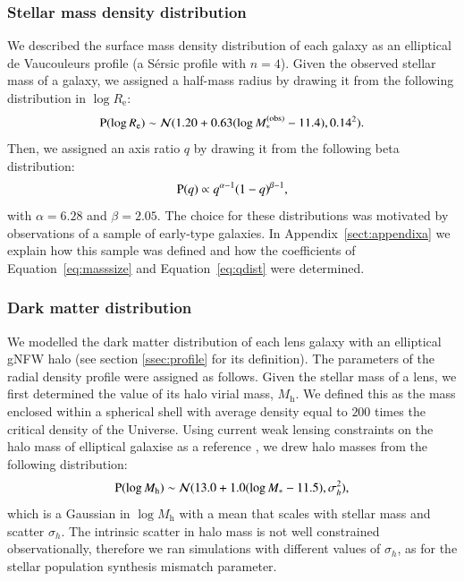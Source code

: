 \documentclass{aa}
\def\reff{R_{\mathrm{e}}}
\def\mstar{M_*}
\def\mobs{M_*^{(\mathrm{obs})}}
\def\mhalo{M_{\mathrm{h}}}
\def\Eref#1{Equation~\ref{#1}\xspace}
\def\pr{{\rm P}}
\begin{document}
\subsubsection{Stellar mass density distribution}

We described the surface mass density distribution of each galaxy as an elliptical de Vaucouleurs profile (a S\'{e}rsic profile with $n=4$).
Given the observed stellar mass of a galaxy, we assigned a half-mass radius by drawing it from the following distribution in $\log{\reff}$:
\begin{equation}\label{eq:masssize}
\pr(\log{\reff}) \sim \mathcal{N}(1.20 + 0.63(\log{\mobs} - 11.4), 0.14^2).
\end{equation}
Then, we assigned an axis ratio $q$ by drawing it from the following beta distribution:
\begin{equation}\label{eq:qdist}
\pr(q) \propto q^{\alpha-1}(1 - q)^{\beta-1},
\end{equation}
with $\alpha=6.28$ and $\beta=2.05$.
The choice for these distributions was motivated by observations of a sample of early-type galaxies. In Appendix~\ref{sect:appendixa} we explain how this sample was defined and how the coefficients of \Eref{eq:masssize} and \Eref{eq:qdist} were determined. 

\subsubsection{Dark matter distribution}\label{ssec:dmprofile}

We modelled the dark matter distribution of each lens galaxy with an elliptical gNFW halo (see section \ref{ssec:profile} for its definition).
The parameters of the radial density profile were assigned as follows.
Given the stellar mass of a lens, we first determined the value of its halo virial mass, $\mhalo$. We defined this as the mass enclosed within a spherical shell with average density equal to $200$ times the critical density of the Universe.
Using current weak lensing constraints on the halo mass of elliptical galaxise as a reference \citep{Son++22}, we drew halo masses from the following distribution:
\begin{equation}
\pr(\log{\mhalo}) \sim \mathcal{N}(13.0 + 1.0(\log{\mstar} - 11.5), \sigma_h^2),
\end{equation}
which is a Gaussian in $\log{\mhalo}$ with a mean that scales with stellar mass and scatter $\sigma_h$.
The intrinsic scatter in halo mass is not well constrained observationally, therefore we ran simulations with different values of $\sigma_h$, as for the stellar population synthesis mismatch parameter.
\end{document}
